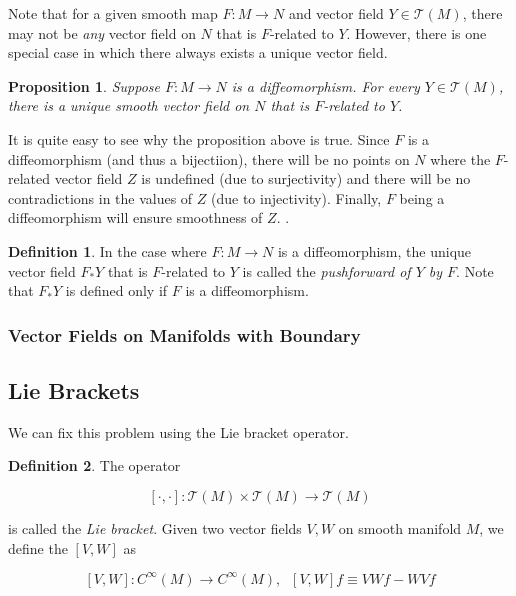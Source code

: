 \documentclass{article}
\newtheorem{proposition}[theorem]{Proposition}
\theoremstyle{remark}
\theoremstyle{definition}
\newtheorem{definition}{Definition}[section]
\begin{document}
      Note that for a given smooth map $F: M \longrightarrow N$ and vector field $Y \in \mathcal{T}(M)$, there may not be \textit{any} vector field on $N$ that is $F$-related to $Y$. However, there is one special case in which there always exists a unique vector field. 

      \begin{proposition}
        Suppose $F: M \longrightarrow N$ is a diffeomorphism. For every $Y \in \mathcal{T}(M)$, there is a unique smooth vector field on $N$ that is $F$-related to $Y$. 
      \end{proposition}

      It is quite easy to see why the proposition above is true. Since $F$ is a diffeomorphism (and thus a bijectiion), there will be no points on $N$ where the $F$-related vector field $Z$ is undefined (due to surjectivity) and there will be no contradictions in the values of $Z$ (due to injectivity). Finally, $F$ being a diffeomorphism will ensure smoothness of $Z$. . 

      \begin{definition}
        In the case where $F: M \longrightarrow N$ is a diffeomorphism, the unique vector field $F_* Y$ that is $F$-related to $Y$ is called the \textit{pushforward of $Y$ by $F$}. Note that $F_* Y$ is defined only if $F$ is a diffeomorphism.  
      \end{definition}

    \subsubsection{Vector Fields on Manifolds with Boundary}

  \subsection{Lie Brackets}

    We can fix this problem using the Lie bracket operator. 

    \begin{definition}
    The operator 

      \[[\cdot, \cdot]: \mathcal{T}(M) \times \mathcal{T} (M) \longrightarrow \mathcal{T}(M)\]

    is called the \textit{Lie bracket}. Given two vector fields $V, W$ on smooth manifold $M$, we define the $[V, W]$ as 

      \[[V, W]: C^\infty(M) \longrightarrow C^\infty (M), \;\; [V, W] f \equiv V W f - W V f\]
    \end{definition}
\end{document}
